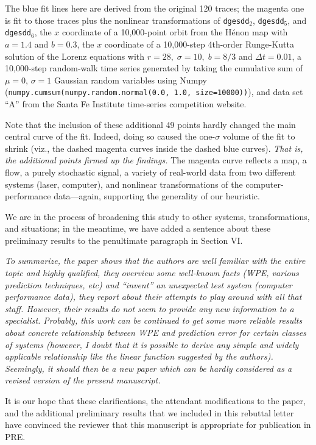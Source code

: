 \documentclass[12pt]{article}
\begin{document}
The blue fit lines here are derived from the original 120 traces; the
magenta one is fit to those traces plus the nonlinear transformations
of {\tt dgesdd}$_2$, {\tt dgesdd}$_5$, and {\tt dgesdd}$_6$, the $x$
coordinate of a 10,000-point orbit from the H\'{e}non map with $a=1.4$
and $b=0.3$, the $x$ coordinate of a 10,000-step 4th-order Runge-Kutta
solution of the Lorenz equations with $r=28, \; \sigma=10, \; b=8/3$
and $\Delta t=0.01$, a 10,000-step random-walk time series generated by
taking the cumulative sum of $\mu=0$, $\sigma=1$ Gaussian random
variables using Numpy ({\tt numpy.cumsum(numpy.random.normal(0.0, 1.0, size=10000))}),
and data set ``A'' from the Santa Fe Institute time-series competition
website.

Note that the inclusion of these additional 49 points hardly changed
the main central curve of the fit.  Indeed, doing so caused the
one-$\sigma$ volume of the fit to shrink (viz., the dashed magenta
curves inside the dashed blue curves).  \emph{That is, the additional
  points firmed up the findings.}  The magenta curve reflects a map, a
flow, a purely stochastic signal, a variety of real-world data from
two different systems (laser, computer), and nonlinear transformations
of the computer-performance data---again, supporting the generality of our
heuristic.

We are in the process of broadening this study to other systems,
transformations, and situations; in the meantime, we have added a
sentence about these preliminary results to the penultimate paragraph
in Section VI.

\smallskip

\emph{To summarize, the paper shows that the authors are well familiar
  with the entire topic and highly qualified, they overview some
  well-known facts (WPE, various prediction techniques, etc) and
  ``invent'' an unexpected test system (computer performance data),
  they report about their attempts to play around with all that
  staff. However, their results do not seem to provide any new
  information to a specialist. Probably, this work can be continued to
  get some more reliable results about concrete relationship between
  WPE and prediction error for certain classes of systems (however, I
  doubt that it is possible to derive any simple and widely applicable
  relationship like the linear function suggested by the
  authors). Seemingly, it should then be a new paper which can be
  hardly considered as a revised version of the present manuscript.}

It is our hope that these clarifications, the attendant modifications
to the paper, and the additional preliminary results that we included
in this rebuttal letter have convinced the reviewer that this
manuscript is appropriate for publication in PRE.
\end{document}
